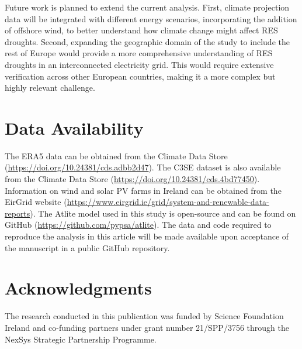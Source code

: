 \documentclass[preprint, 12pt]{elsarticle}
\begin{document}
Future work is planned to extend the current analysis. First, climate projection data will be integrated with different energy scenarios, incorporating the addition of offshore wind, to better understand how climate change might affect RES droughts. Second, expanding the geographic domain of the study to include the rest of Europe would provide a more comprehensive understanding of RES droughts in an interconnected electricity grid. This would require extensive verification across other European countries, making it a more complex but highly relevant challenge.

\section*{Data Availability}

The ERA5 data can be obtained from the Climate Data Store (\url{https://doi.org/10.24381/cds.adbb2d47}). The C3SE dataset is also available from the Climate Data Store (\url{https://doi.org/10.24381/cds.4bd77450}). Information on wind and solar PV farms in Ireland can be obtained from the EirGrid website (\url{https://www.eirgrid.ie/grid/system-and-renewable-data-reports}). The Atlite model used in this study is open-source and can be found on GitHub (\url{https://github.com/pypsa/atlite}). The data and code required to reproduce the analysis in this article will be made available upon acceptance of the manuscript in a public GitHub repository.

\section*{Acknowledgments}

The research conducted in this publication was funded by Science Foundation Ireland and co-funding partners under grant number 21/SPP/3756 through the NexSys Strategic Partnership Programme.



\end{document}
